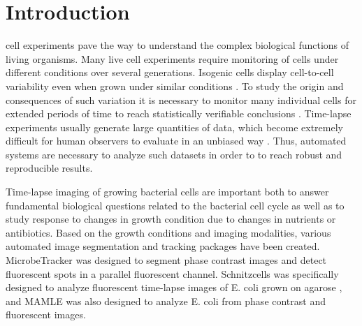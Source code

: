 \documentclass[journal]{IEEEtran}
\begin{document}
%
\IEEEpeerreviewmaketitle



\section{Introduction}
% 
% 
% 
% 
 cell experiments pave the way to understand the complex biological functions of living organisms. Many live cell experiments require monitoring of cells under different conditions over several generations. Isogenic cells display cell-to-cell variability even when grown under similar conditions \cite{elowitzstochastic2002}. To study the origin and consequences of such variation it is necessary to monitor many individual cells for extended periods of time to reach statistically verifiable conclusions \cite{yuichiquantify2010}. Time-lapse experiments usually generate large quantities of data, which become extremely difficult for human observers to evaluate in an unbiased way \cite{qiangmicroscope2008}. Thus, automated systems are necessary to analyze such datasets in order to to reach robust and reproducible results. 

Time-lapse imaging of growing bacterial cells are important both to answer fundamental biological questions related to the bacterial cell cycle as well as to study response to changes in growth condition due to changes in nutrients or antibiotics. Based on the growth conditions and imaging modalities, various automated image segmentation and tracking packages have been created. MicrobeTracker \cite {sliusarenkohigh2011} was designed to segment phase contrast images and detect fluorescent spots in a parallel fluorescent channel. Schnitzcells was specifically designed to analyze fluorescent time-lapse images of E. coli grown on agarose \cite  {youngmeasuring2012}, and MAMLE \cite {chowdhurycell2013} was also designed to analyze E. coli from phase contrast and fluorescent images.
\end{document}
